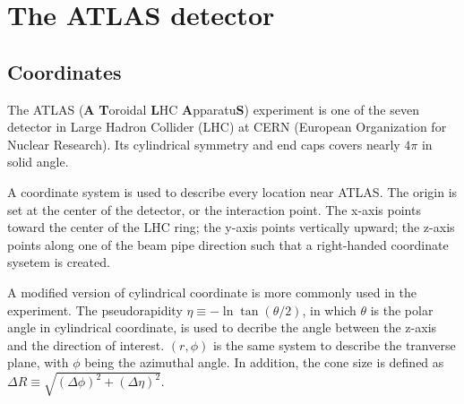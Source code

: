 \documentclass[class=NCU_thesis, crop=false]{standalone}
\begin{document}
\chapter{The ATLAS detector}
\section{Coordinates}
	The ATLAS (\textbf{A} \textbf{T}oroidal \textbf{L}HC \textbf{A}pparatu\textbf{S}) experiment is one of the seven detector in Large Hadron Collider (LHC) at CERN (European Organization for Nuclear Research). Its cylindrical symmetry and end caps covers nearly $4\pi$ in solid angle.
	
	A coordinate system is used to describe every location near ATLAS. The origin is set at the center of the detector, or the interaction point. The x-axis points toward the center of the LHC ring; the y-axis points vertically upward; the z-axis points along one of the beam pipe direction such that a right-handed coordinate sysetem is created.
	
	A modified version of cylindrical coordinate is more commonly used in the experiment. The pseudorapidity $\eta \equiv -\ln\tan(\theta / 2)$, in which $\theta$ is the polar angle in cylindrical coordinate, is used to decribe the angle between the z-axis and the direction of interest. $(r, \phi)$ is the same system to describe the tranverse plane, with $\phi$ being the azimuthal angle. In addition, the cone size is defined as $\Delta R \equiv \sqrt{(\Delta \phi)^2 + (\Delta \eta)^2}$.
\end{document}

